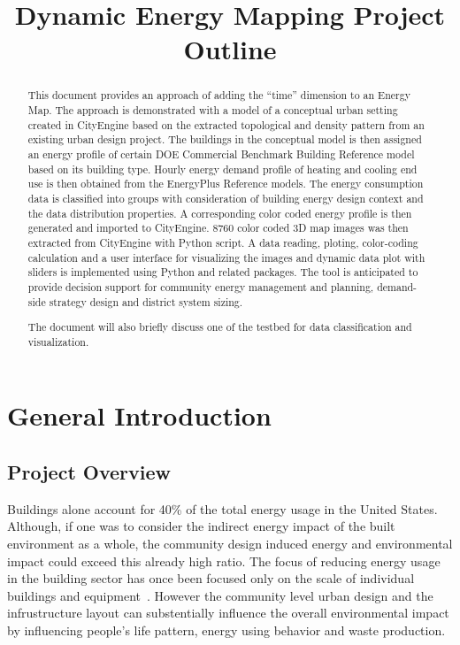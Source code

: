 \documentclass[hidelinks,12pt]{article}
\begin{document}
\title{Dynamic Energy Mapping Project Outline}
\maketitle
\tableofcontents
\newpage
\begin{abstract}
  This document provides an approach of adding the ``time'' dimension
  to an Energy Map. The approach is demonstrated with a model of a
  conceptual urban setting created in CityEngine based on the
  extracted topological and density pattern from an existing urban
  design project. The buildings in the conceptual model is then
  assigned an energy profile of certain DOE Commercial Benchmark
  Building Reference model based on its building type. Hourly energy
  demand profile of heating and cooling end use is then obtained from
  the EnergyPlus Reference models. The energy consumption data is
  classified into groups with consideration of building energy design
  context and the data distribution properties. A corresponding color
  coded energy profile is then generated and imported to
  CityEngine. 8760 color coded 3D map images was then extracted from
  CityEngine with Python script. A data reading, ploting,
  color-coding calculation and a user interface for visualizing the
  images and dynamic data plot with sliders is implemented using
  Python and related packages. The tool is anticipated to provide
  decision support for community energy management and
  planning, demand-side strategy design and district system sizing.
  
  The document will also briefly discuss one of the testbed for data
  classification and visualization.
\end{abstract}
\newpage

\section{General Introduction}
\subsection{Project Overview}
Buildings alone account for 40\% of the total energy usage in the
United States. Although, if one was to consider the indirect energy
impact of the built environment as a whole, the community design
induced energy and environmental impact could exceed this already high
ratio. The focus of reducing energy usage in the building sector has
once been focused only on the scale of individual buildings and
equipment~\cite{Jaccard19971065}. However the community level urban
design and the infrustructure layout can substentially influence the
overall environmental impact by influencing people's life pattern,
energy using behavior and waste production.
\end{document}
